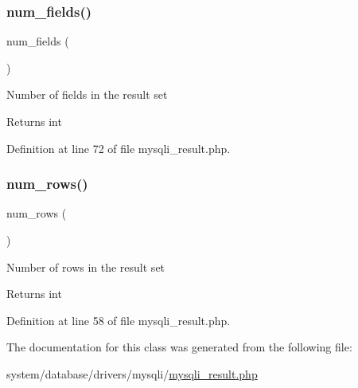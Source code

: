 \mbox{\label{class_c_i___d_b__mysqli__result_af831bf363e4d7d661a717a4932af449d}} 
\subsubsection{\texorpdfstring{num\_fields()}{num\_fields()}}
{\footnotesize\ttfamily num\+\_\+fields (\begin{DoxyParamCaption}{ }\end{DoxyParamCaption})}

Number of fields in the result set

\begin{DoxyReturn}{Returns}
int 
\end{DoxyReturn}


Definition at line 72 of file mysqli\+\_\+result.\+php.

\mbox{\label{class_c_i___d_b__mysqli__result_a218657c303ee499b97710ab0cd2f5d6e}} 
\subsubsection{\texorpdfstring{num\_rows()}{num\_rows()}}
{\footnotesize\ttfamily num\+\_\+rows (\begin{DoxyParamCaption}{ }\end{DoxyParamCaption})}

Number of rows in the result set

\begin{DoxyReturn}{Returns}
int 
\end{DoxyReturn}


Definition at line 58 of file mysqli\+\_\+result.\+php.



The documentation for this class was generated from the following file\+:\begin{DoxyCompactItemize}
\item 
system/database/drivers/mysqli/\mbox{\hyperlink{mysqli__result_8php}{mysqli\+\_\+result.\+php}}\end{DoxyCompactItemize}
